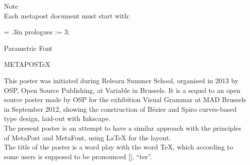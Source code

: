 \documentclass[danish,a2paper,22pt]{scrartcl}
\begin{document}
\begin{multicols*}{3}
\begin{spacing}{0.5}
\vspace{2cm}

\color{White}
\romansmall
Note\\
\vspace{.4cm}
\color{Black}
Each metapost document must start with:\\
{\leftskip = .3in
\typewritersmall
prologues := 3;     %
\par}

\columnbreak

Parametric Font

\end{spacing}

\end{multicols*}

\pagebreak



\begin{center}
\color{White}
{\normalfont\logofamily \Huge METAPOS}\Huge {\TeX}
\end{center}

\begin{spacing}{1.5}
\metaessay
\noindent
This poster was initiated during Relearn Summer School, organised in 2013 by OSP, Open Source Publishing, at Variable in Brussels. 
It is a sequel to an open source poster made by OSP for the exhibition Visual Grammar at MAD Brussels in September 2012, showing the construction of Bézier and Spiro curves-based type design, laid-out with Inkscape.\\
The present poster is an attempt to have a similar approach with the principles of MetaPost and MetaFont, using \fontsize{100pt}{38pt}\LaTeX{} for the layout.\\
The title of the poster is a word play with the word \TeX{}, which according to some users is supposed to be pronounced [], “ter”.
\end{spacing}
\end{document}
